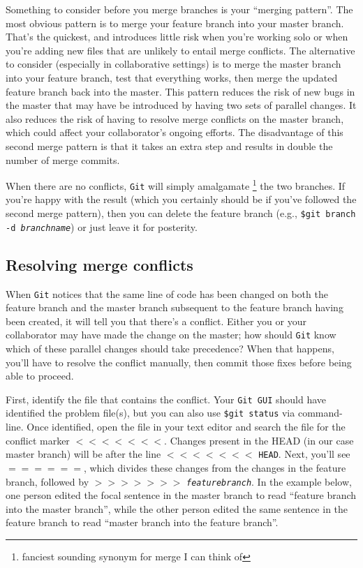 \documentclass[12pt,letterpaper]{article}
\begin{document}
Something to consider before you merge branches is your ``merging pattern''.
The most obvious pattern is to merge your feature branch into your master branch.
That's the quickest, and introduces little risk when you're working solo or when you're adding new files that are unlikely to entail merge conflicts.
The alternative to consider (especially in collaborative settings) is to merge the 
master branch into your feature branch, test that everything works, 
then merge the updated feature branch back into the master.
This pattern reduces the risk of new bugs in the master that may have be introduced by having two sets of parallel changes.
It also reduces the risk of having to resolve merge conflicts on the master branch, which could affect your collaborator's ongoing efforts.
The disadvantage of this second merge pattern is that it takes an extra step and results in double the number of merge commits.

When there are no conflicts, \texttt{Git} will simply amalgamate
\unskip
\footnote{fanciest sounding synonym for merge I can think of}
the two branches.
If you're happy with the result (which you certainly should be if you've followed 
the second merge pattern), 
then you can delete the feature branch
(e.g., \texttt{\$git branch -d \emph{branchname}})
or just leave it for posterity.

\subsection{Resolving merge conflicts}

When \texttt{Git} notices that the same line of code has been changed on both the feature branch and the master branch subsequent to the feature branch having been created, it will tell you that there's a conflict.
Either you or your collaborator may have made the change on the master;
how should \texttt{Git} know which of these parallel changes should take precedence?
When that happens, you'll have to resolve the conflict manually, 
then commit those fixes before being able to proceed.

First, identify the file that contains the conflict.
Your \texttt{Git GUI} should have identified the problem file(s), 
but you can also use \texttt{\$git status} via command-line.
Once identified, open the file in your text editor and search the file for the 
conflict marker $<<<<<<<$.
Changes present in the HEAD (in our case master branch) will be after the line $<<<<<<<$ \texttt{HEAD}.
Next, you'll see $======$, which divides these changes from the changes in 
the feature branch, 
followed by $>>>>>>>$ \texttt{\emph{featurebranch}}.
In the example below, one person edited the focal sentence in the master 
branch to read 
``feature branch into the master branch'', 
while the other person edited the same sentence in the feature branch to read 
``master branch into the feature branch''.
\end{document}
